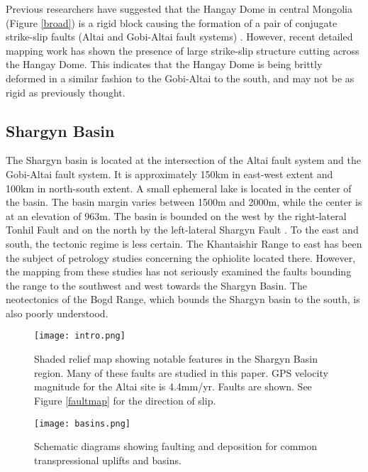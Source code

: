 	Previous researchers have suggested that the Hangay Dome in central Mongolia (Figure \ref{broad}) is a rigid block causing the formation of a pair of conjugate strike-slip faults (Altai and Gobi-Altai fault systems) \citep{Cunningham2005a}. However, recent detailed mapping work has shown the presence of large strike-slip structure cutting across the Hangay Dome. This indicates that the Hangay Dome is being brittly deformed in a similar fashion to the Gobi-Altai to the south, and may not be as rigid as previously thought\citep{Walker2006}\citep{Walker2007}\citep{Walker2008}.

\subsection{Shargyn Basin}

	The Shargyn basin is located at the intersection of the Altai fault system and the Gobi-Altai fault system. It is approximately 150km in east-west extent and 100km in north-south extent. A small ephemeral lake is located in the center of the basin. The basin margin varies between 1500m and 2000m, while the center is at an elevation of 963m. The basin is bounded on the west by the right-lateral Tonhil Fault and on the north by the left-lateral Shargyn Fault \citep{Cunningham2003}. To the east and south, the tectonic regime is less certain. The Khantaishir Range to east has been the subject of petrology studies concerning the ophiolite located there. However, the mapping from these studies has not seriously examined the faults bounding the range to the southwest and west towards the Shargyn Basin.  The neotectonics of the Bogd Range, which bounds the Shargyn basin to the south, is also poorly understood.

\begin{figure}[h!]
	\centering
	\texttt{[image: intro.png]}
	\caption{Shaded relief map showing notable features in the Shargyn Basin region. Many of these faults are studied in this paper. GPS velocity magnitude for the Altai site is 4.4mm/yr. Faults are shown. See Figure \ref{faultmap} for the direction of slip.}
	\label{regional}
\end{figure}
	
	
\begin{figure}[h!]
  \centering
  \texttt{[image: basins.png]}
  \caption{Schematic diagrams showing faulting and deposition for common transpressional uplifts and basins.}
  \label{basintypes}
\end{figure}

